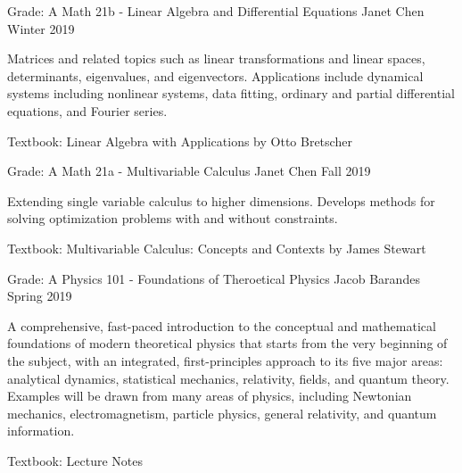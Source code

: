 \begin{cventries}
  \cventry
  {Grade: A} %
  {Math 21b - Linear Algebra and Differential Equations} %
  {Janet Chen} %
  {Winter 2019} %
  {
    \begin{cvitems} %
    \item {Matrices and related topics such as linear transformations and linear spaces, determinants, eigenvalues, and eigenvectors. Applications include dynamical systems including nonlinear systems, data fitting, ordinary and partial differential equations, and Fourier series.}
    \item {Textbook: Linear Algebra with Applications by Otto Bretscher}
    \end{cvitems}
  }

  \cventry
  {Grade: A} %
  {Math 21a - Multivariable Calculus} %
  {Janet Chen} %
  {Fall 2019} %
  {
    \begin{cvitems} %
    \item {Extending single variable calculus to higher dimensions. Develops methods for solving optimization problems with and without constraints.}
    \item {Textbook: Multivariable Calculus: Concepts and Contexts by James Stewart}
    \end{cvitems}
  }


\end{cventries}


\begin{cventries}
  \cventry
  {Grade: A} %
  {Physics 101 - Foundations of Theroetical Physics} %
  {Jacob Barandes} %
  {Spring 2019} %
  {
    \begin{cvitems} %
    \item {A comprehensive, fast-paced introduction to the conceptual and mathematical foundations of modern theoretical physics that starts from the very beginning of the subject, with an integrated, first-principles approach to its five major areas: analytical dynamics, statistical mechanics, relativity, fields, and quantum theory. Examples will be drawn from many areas of physics, including Newtonian mechanics, electromagnetism, particle physics, general relativity, and quantum information.}
    \item {Textbook: Lecture Notes}
    \end{cvitems}
  }

\end{cventries}

